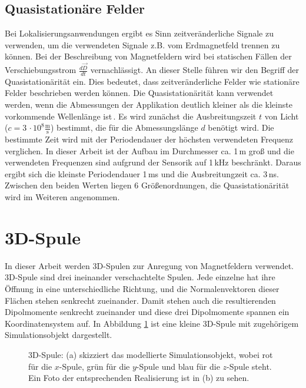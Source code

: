  
\subsection{Quasistationäre Felder}
\label{subsec:Quasistationairy}
Bei Lokalisierungsanwendungen ergibt es Sinn zeitveränderliche Signale zu verwenden, um die verwendeten Signale z.B. vom Erdmagnetfeld trennen zu können. Bei der Beschreibung von Magnetfeldern wird bei statischen Fällen der Verschiebungsstrom $\frac{d \vec{D}}{d t}$ vernachlässigt. An dieser Stelle führen wir den Begriff der Quasistationärität ein. Dies bedeutet, dass zeitveränderliche Felder wie stationäre Felder beschrieben werden können. Die Quasistationärität kann verwendet werden, wenn die Abmessungen der Applikation deutlich kleiner als die kleinste vorkommende Wellenlänge ist\,\cite{wolfgang_nolting_grundkurs_nodate}. 
Es wird zunächst die Ausbreitungszeit $t$ von Licht ($c = 3\,\cdot 10^8 \frac{\text{m}}{\text{s}}$) bestimmt, die für die Abmessungslänge $d$ benötigt wird. Die bestimmte Zeit wird mit der Periodendauer der höchsten verwendeten Frequenz verglichen. In dieser Arbeit ist der Aufbau im Durchmesser ca. 1\,m groß und die verwendeten Frequenzen sind aufgrund der Sensorik auf 1\,kHz beschränkt. Daraus ergibt sich die kleinste Periodendauer 1\,ms und die Ausbreitungzeit ca. 3\,ns. Zwischen den beiden Werten liegen 6 Größenordnungen, die Quasistationärität wird im Weiteren angenommen.

\section{3D-Spule}
\label{sec:3d_Spule}

In dieser Arbeit werden 3D-Spulen zur Anregung von Magnetfeldern verwendet. 3D-Spule sind drei ineinander verschachtelte Spulen. Jede einzelne hat ihre Öffnung in eine unterschiedliche Richtung, und die Normalenvektoren dieser Flächen stehen senkrecht zueinander. Damit stehen auch die resultierenden Dipolmomente senkrecht zueinander und diese drei Dipolmomente spannen ein Koordinatensystem auf. In Abbildung \ref{fig:3DCoil} ist eine kleine 3D-Spule mit zugehörigem Simulationsobjekt dargestellt. 

\begin{figure}[h]
    \centering
    \caption{3D-Spule: (a) skizziert das modellierte Simulationsobjekt, wobei rot für die $x$-Spule, grün für die $y$-Spule und blau für die $z$-Spule steht. Ein Foto der entsprechenden Realisierung ist in (b) zu sehen.}
    \label{fig:3DCoil}
\end{figure}

